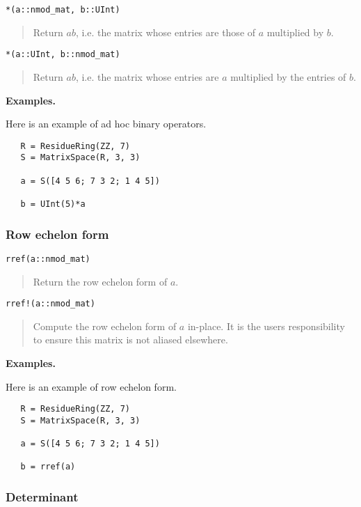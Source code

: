 \documentclass[a4paper,10pt]{article}
\newcommand{\desc}[1]{\vspace{-3mm}\begin{quote}#1\end{quote}}
\begin{document}
{{\begin{lstlisting}
*(a::nmod_mat, b::UInt)
\end{lstlisting}

\desc{Return $ab$, i.e. the matrix whose entries are those of $a$ multiplied by $b$.}

\begin{lstlisting}
*(a::UInt, b::nmod_mat)
\end{lstlisting}

\desc{Return $ab$, i.e. the matrix whose entries are $a$ multiplied by the entries
of $b$.}

\textbf{Examples.}

Here is an example of ad hoc binary operators.

\begin{lstlisting}
   R = ResidueRing(ZZ, 7)
   S = MatrixSpace(R, 3, 3)

   a = S([4 5 6; 7 3 2; 1 4 5])

   b = UInt(5)*a
\end{lstlisting}

\subsubsection{Row echelon form}

\begin{lstlisting}
rref(a::nmod_mat)
\end{lstlisting}

\desc{Return the row echelon form of $a$.}

\begin{lstlisting}
rref!(a::nmod_mat)
\end{lstlisting}

\desc{Compute the row echelon form of $a$ in-place. It is the users responsibility
to ensure this matrix is not aliased elsewhere.}

\textbf{Examples.}

Here is an example of row echelon form.

\begin{lstlisting}
   R = ResidueRing(ZZ, 7)
   S = MatrixSpace(R, 3, 3)

   a = S([4 5 6; 7 3 2; 1 4 5])

   b = rref(a)
\end{lstlisting}

\subsubsection{Determinant}

}}
\end{document}
